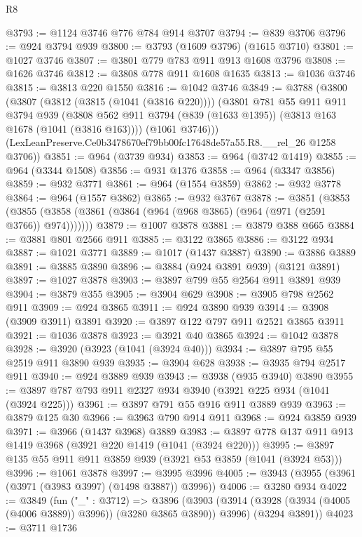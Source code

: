 \begin{lexlean}{R8}
\begin{coremodule}
@3793 := @1124 @3746 @776 @784 @914 @3707
@3794 := @839 @3706
@3796 := @924 @3794 @939
@3800 := @3793 (@1609 @3796) (@1615 @3710)
@3801 := @1027 @3746
@3807 := @3801 @779 @783 @911 @913 @1608 @3796
@3808 := @1626 @3746
@3812 := @3808 @778 @911 @1608 @1635
@3813 := @1036 @3746
@3815 := @3813 @220 @1550
@3816 := @1042 @3746
@3849 := @3788
    (@3800
      (@3807
        (@3812 (@3815 (@1041 (@3816 @220))))
        (@3801
          @781
          @55
          @911
          @911
          @3794
          @939
          (@3808 @562 @911 @3794 (@839 (@1633 @1395)) (@3813 @163 @1678 (@1041 (@3816 @163))))
          (@1061 @3746)))
      (LexLeanPreserve.Ce0b3478670ef79bb00fc17648de57a55.R8.__rel_26 @1258 @3706))
@3851 := @964 (@3739 @934)
@3853 := @964 (@3742 @1419)
@3855 := @964 (@3344 @1508)
@3856 := @931 @1376
@3858 := @964 (@3347 @3856)
@3859 := @932 @3771
@3861 := @964 (@1554 @3859)
@3862 := @932 @3778
@3864 := @964 (@1557 @3862)
@3865 := @932 @3767
@3878 := @3851
    (@3853 (@3855 (@3858 (@3861 (@3864 (@964 (@968 @3865) (@964 (@971 (@2591 @3766)) @974)))))))
@3879 := @1007 @3878
@3881 := @3879 @388 @665
@3884 := @3881 @801 @2566 @911
@3885 := @3122 @3865
@3886 := @3122 @934
@3887 := @1021 @3771
@3889 := @1017 (@1437 @3887)
@3890 := @3886 @3889
@3891 := @3885 @3890
@3896 := @3884 (@924 @3891 @939) (@3121 @3891)
@3897 := @1027 @3878
@3903 := @3897 @799 @55 @2564 @911 @3891 @939
@3904 := @3879 @355
@3905 := @3904 @629
@3908 := @3905 @798 @2562 @911
@3909 := @924 @3865
@3911 := @924 @3890 @939
@3914 := @3908 (@3909 @3911) @3891
@3920 := @3897 @122 @797 @911 @2521 @3865 @3911
@3921 := @1036 @3878
@3923 := @3921 @40 @3865
@3924 := @1042 @3878
@3928 := @3920 (@3923 (@1041 (@3924 @40)))
@3934 := @3897 @795 @55 @2519 @911 @3890 @939
@3935 := @3904 @628
@3938 := @3935 @794 @2517 @911
@3940 := @924 @3889 @939
@3943 := @3938 (@935 @3940) @3890
@3955 := @3897 @787 @793 @911 @2327 @934 @3940 (@3921 @225 @934 (@1041 (@3924 @225)))
@3961 := @3897 @791 @55 @916 @911 @3889 @939
@3963 := @3879 @125 @30
@3966 := @3963 @790 @914 @911
@3968 := @924 @3859 @939
@3971 := @3966 (@1437 @3968) @3889
@3983 := @3897 @778 @137 @911 @913 @1419 @3968 (@3921 @220 @1419 (@1041 (@3924 @220)))
@3995 := @3897 @135 @55 @911 @911 @3859 @939 (@3921 @53 @3859 (@1041 (@3924 @53)))
@3996 := @1061 @3878
@3997 := @3995 @3996
@4005 := @3943 (@3955 (@3961 (@3971 (@3983 @3997) (@1498 @3887)) @3996))
@4006 := @3280 @934
@4022 := @3849
    (fun ("_" : @3712) =>
    @3896
      (@3903 (@3914 (@3928 (@3934 (@4005 (@4006 @3889)) @3996)) (@3280 @3865 @3890)) @3996)
      (@3294 @3891))
@4023 := @3711 @1736

\end{coremodule}
\end{lexlean}
